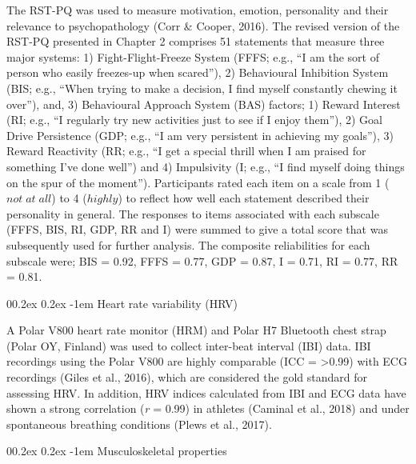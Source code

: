 \documentclass[
  english,
  man,floatsintext]{apa6}
\makeatletter
\renewcommand{\paragraph}{\@startsection{paragraph}{4}{\parindent}%
  {0\baselineskip \@plus 0.2ex \@minus 0.2ex}%
  {-1em}%
  {\normalfont\normalsize\bfseries\itshape\typesectitle}}
\makeatother
\begin{document}
The RST-PQ was used to measure motivation, emotion, personality and their relevance to psychopathology (Corr \& Cooper, 2016).
The revised version of the RST-PQ presented in Chapter 2 comprises 51 statements that measure three major systems:
1) Fight-Flight-Freeze System (FFFS; e.g., \enquote{I am the sort of person who easily freezes-up when scared}),
2) Behavioural Inhibition System (BIS; e.g., \enquote{When trying to make a decision, I find myself constantly chewing it over}), and,
3) Behavioural Approach System (BAS) factors;
1) Reward Interest (RI; e.g., \enquote{I regularly try new activities just to see if I enjoy them}),
2) Goal Drive Persistence (GDP; e.g., \enquote{I am very persistent in achieving my goals}),
3) Reward Reactivity (RR; e.g., \enquote{I get a special thrill when I am praised for something I've done well}) and
4) Impulsivity (I; e.g., \enquote{I find myself doing things on the spur of the moment}).
Participants rated each item on a scale from 1 (\(not\; at\; all\)) to 4 (\(highly\)) to reflect how well each statement described their personality in general.
The responses to items associated with each subscale (FFFS, BIS, RI, GDP, RR and I) were summed to give a total score that was subsequently used for further analysis.
The composite reliabilities for each subscale were; BIS = 0.92, FFFS = 0.77, GDP = 0.87, I = 0.71, RI = 0.77, RR = 0.81.

\hypertarget{heart-rate-variability-hrv-1}{%
\paragraph{Heart rate variability (HRV)}\label{heart-rate-variability-hrv-1}}

A Polar V800 heart rate monitor (HRM) and Polar H7 Bluetooth chest strap (Polar OY, Finland) was used to collect inter-beat interval (IBI) data.
IBI recordings using the Polar V800 are highly comparable (ICC = \textgreater0.99) with ECG recordings (Giles et al., 2016), which are considered the gold standard for assessing HRV.
In addition, HRV indices calculated from IBI and ECG data have shown a strong correlation (\emph{r} = 0.99) in athletes (Caminal et al., 2018) and under spontaneous breathing conditions (Plews et al., 2017).

\hypertarget{musculoskeletal-properties}{%
\paragraph{Musculoskeletal properties}\label{musculoskeletal-properties}}
\end{document}
